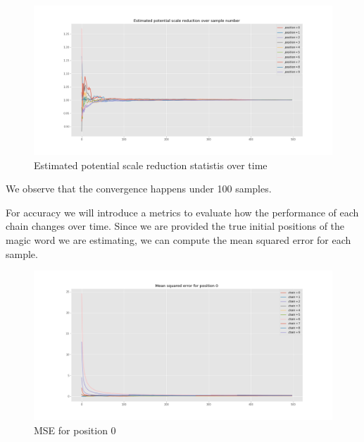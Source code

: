 \documentclass[]{article}
\begin{document}
	\begin{figure}[H]
		\begin{center}
			
			\includegraphics[width=1\textwidth]{task4/figures/T_2_4/Q2/convergence_epsr.png}
			\caption*{Estimated potential scale reduction statistis over time}
		\end{center}
	\end{figure}
	
	We observe that the convergence happens under 100 samples.
	
	For accuracy we will introduce a metrics to evaluate how the performance of each chain changes over time. Since we are provided the true initial positions of the magic word we are estimating, we can compute the mean squared error for each sample.
	
	\begin{figure}[H]
		\begin{center}
			
			\includegraphics[width=1\textwidth]{task4/figures/T_2_4/Q2/mse_pos0.png}
			\caption*{MSE for position 0}
		\end{center}
	\end{figure}
	
\end{document}
